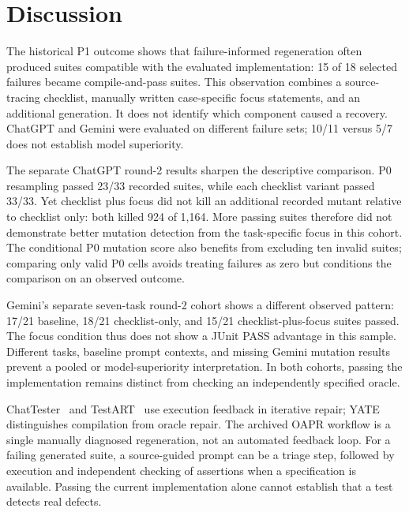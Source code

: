 \section{Discussion}
\label{sec:discussion}
The historical P1 outcome shows that failure-informed regeneration often produced suites compatible with the evaluated implementation: 15 of 18 selected failures became compile-and-pass suites. This observation combines a source-tracing checklist, manually written case-specific focus statements, and an additional generation. It does not identify which component caused a recovery. ChatGPT and Gemini were evaluated on different failure sets; 10/11 versus 5/7 does not establish model superiority.

The separate ChatGPT round-2 results sharpen the descriptive comparison. P0 resampling passed 23/33 recorded suites, while each checklist variant passed 33/33. Yet checklist plus focus did not kill an additional recorded mutant relative to checklist only: both killed 924 of 1,164. More passing suites therefore did not demonstrate better mutation detection from the task-specific focus in this cohort. The conditional P0 mutation score also benefits from excluding ten invalid suites; comparing only valid P0 cells avoids treating failures as zero but conditions the comparison on an observed outcome.

Gemini's separate seven-task round-2 cohort shows a different observed pattern: 17/21 baseline, 18/21 checklist-only, and 15/21 checklist-plus-focus suites passed. The focus condition thus does not show a JUnit PASS advantage in this sample. Different tasks, baseline prompt contexts, and missing Gemini mutation results prevent a pooled or model-superiority interpretation. In both cohorts, passing the implementation remains distinct from checking an independently specified oracle.

ChatTester~\cite{yuan2024chattester} and TestART~\cite{gu2024testart} use execution feedback in iterative repair; YATE~\cite{konstantinou2025yate} distinguishes compilation from oracle repair. The archived OAPR workflow is a single manually diagnosed regeneration, not an automated feedback loop. For a failing generated suite, a source-guided prompt can be a triage step, followed by execution and independent checking of assertions when a specification is available. Passing the current implementation alone cannot establish that a test detects real defects.
